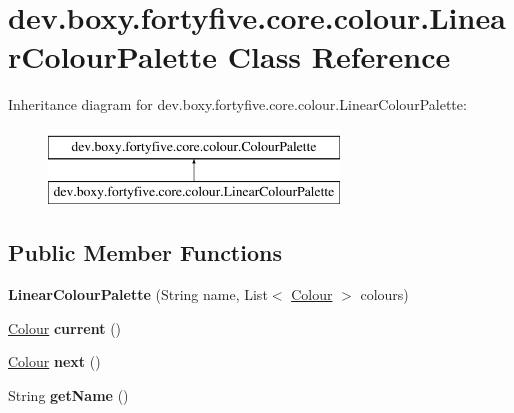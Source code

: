 \hypertarget{classdev_1_1boxy_1_1fortyfive_1_1core_1_1colour_1_1_linear_colour_palette}{
\section{dev.boxy.fortyfive.core.colour.LinearColourPalette Class Reference}
\label{df/dda/classdev_1_1boxy_1_1fortyfive_1_1core_1_1colour_1_1_linear_colour_palette}
}
Inheritance diagram for dev.boxy.fortyfive.core.colour.LinearColourPalette:\begin{figure}[H]
\begin{center}
\leavevmode
\includegraphics[height=2.000000cm]{df/dda/classdev_1_1boxy_1_1fortyfive_1_1core_1_1colour_1_1_linear_colour_palette}
\end{center}
\end{figure}
\subsection*{Public Member Functions}
\begin{DoxyCompactItemize}
\item 
\hypertarget{classdev_1_1boxy_1_1fortyfive_1_1core_1_1colour_1_1_linear_colour_palette_a79f3a23a190accb969d3f6dc238282fc}{
{\bfseries LinearColourPalette} (String name, List$<$ \hyperlink{classdev_1_1boxy_1_1fortyfive_1_1core_1_1colour_1_1_colour}{Colour} $>$ colours)}
\label{df/dda/classdev_1_1boxy_1_1fortyfive_1_1core_1_1colour_1_1_linear_colour_palette_a79f3a23a190accb969d3f6dc238282fc}

\item 
\hypertarget{classdev_1_1boxy_1_1fortyfive_1_1core_1_1colour_1_1_linear_colour_palette_a6883ffacbf361cca5e44e90f39502898}{
\hyperlink{classdev_1_1boxy_1_1fortyfive_1_1core_1_1colour_1_1_colour}{Colour} {\bfseries current} ()}
\label{df/dda/classdev_1_1boxy_1_1fortyfive_1_1core_1_1colour_1_1_linear_colour_palette_a6883ffacbf361cca5e44e90f39502898}

\item 
\hypertarget{classdev_1_1boxy_1_1fortyfive_1_1core_1_1colour_1_1_linear_colour_palette_a0faa4fa07e5c9ac3ccf7d3e4f6f9ae01}{
\hyperlink{classdev_1_1boxy_1_1fortyfive_1_1core_1_1colour_1_1_colour}{Colour} {\bfseries next} ()}
\label{df/dda/classdev_1_1boxy_1_1fortyfive_1_1core_1_1colour_1_1_linear_colour_palette_a0faa4fa07e5c9ac3ccf7d3e4f6f9ae01}

\item 
\hypertarget{classdev_1_1boxy_1_1fortyfive_1_1core_1_1colour_1_1_linear_colour_palette_a32e81e9e127567453caecaf5fcf60a77}{
String {\bfseries getName} ()}
\label{df/dda/classdev_1_1boxy_1_1fortyfive_1_1core_1_1colour_1_1_linear_colour_palette_a32e81e9e127567453caecaf5fcf60a77}

\end{DoxyCompactItemize}
